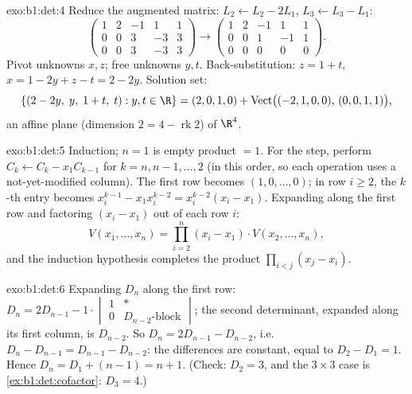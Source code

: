 \begin{solution}{exo:b1:det:4}
Reduce the augmented matrix: $L_2 \leftarrow L_2 - 2L_1$, $L_3
\leftarrow L_3 - L_1$:
\[
\begin{pmatrix}
1 & 2 & -1 & 1 & 1\\
0 & 0 & 3 & -3 & 3\\
0 & 0 & 3 & -3 & 3
\end{pmatrix}
\to
\begin{pmatrix}
1 & 2 & -1 & 1 & 1\\
0 & 0 & 1 & -1 & 1\\
0 & 0 & 0 & 0 & 0
\end{pmatrix}.
\]
Pivot unknowns $x, z$; free unknowns $y, t$. Back-substitution: $z =
1 + t$, $x = 1 - 2y + z - t = 2 - 2y$. Solution set:
\[
\{(2 - 2y,\; y,\; 1 + t,\; t) : y, t \in \R\}
= (2, 0, 1, 0) + \operatorname{Vect}\bigl((-2,1,0,0),\,
(0,0,1,1)\bigr),
\]
an affine plane (dimension $2 = 4 - \operatorname{rk} 2$) of $\R^4$.
\end{solution}

\begin{solution}{exo:b1:det:5}
Induction; $n = 1$ is empty product $= 1$. For the step, perform
$C_k \leftarrow C_k - x_1 C_{k-1}$ for $k = n, n-1, \dots, 2$ (in
this order, so each operation uses a not-yet-modified column). The
first row becomes $(1, 0, \dots, 0)$; in row $i \geq 2$, the $k$-th
entry becomes $x_i^{k-1} - x_1 x_i^{k-2} = x_i^{k-2}(x_i - x_1)$.
Expanding along the first row and factoring $(x_i - x_1)$ out of
each row $i$:
\[
V(x_1, \dots, x_n)
= \prod_{i=2}^{n} (x_i - x_1)\cdot V(x_2, \dots, x_n),
\]
and the induction hypothesis completes the product $\prod_{i<j}(x_j
- x_i)$.
\end{solution}

\begin{solution}{exo:b1:det:6}
Expanding $D_n$ along the first row: $D_n = 2 D_{n-1} -
1\cdot\begin{vmatrix} 1 & \ast\\ 0 & D_{n-2}\text{-block}
\end{vmatrix}$; the second determinant, expanded along its first
column, is $D_{n-2}$. So $D_n = 2D_{n-1} - D_{n-2}$, i.e.\ $D_n -
D_{n-1} = D_{n-1} - D_{n-2}$: the differences are constant, equal to
$D_2 - D_1 = 1$. Hence $D_n = D_1 + (n - 1) = n + 1$.
(Check: $D_2 = 3$, and the $3\times3$ case is
\cref{ex:b1:det:cofactor}: $D_3 = 4$.)
\end{solution}


